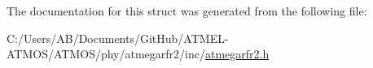 The documentation for this struct was generated from the following file\-:\begin{DoxyCompactItemize}
\item 
C\-:/\-Users/\-A\-B/\-Documents/\-Git\-Hub/\-A\-T\-M\-E\-L-\/\-A\-T\-M\-O\-S/\-A\-T\-M\-O\-S/phy/atmegarfr2/inc/\hyperlink{atmegarfr2_8h}{atmegarfr2.\-h}\end{DoxyCompactItemize}

